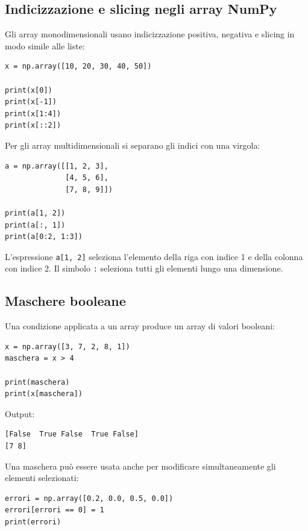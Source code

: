 \documentclass[11pt,a4paper]{book}
\begin{document}
\subsection{Indicizzazione e slicing negli array NumPy}

Gli array monodimensionali usano indicizzazione positiva, negativa e slicing in modo simile alle liste:

\begin{lstlisting}[style=python]
x = np.array([10, 20, 30, 40, 50])

print(x[0])
print(x[-1])
print(x[1:4])
print(x[::2])
\end{lstlisting}

Per gli array multidimensionali si separano gli indici con una virgola:

\begin{lstlisting}[style=python]
a = np.array([[1, 2, 3],
              [4, 5, 6],
              [7, 8, 9]])

print(a[1, 2])
print(a[:, 1])
print(a[0:2, 1:3])
\end{lstlisting}

L'espressione \texttt{a[1, 2]} seleziona l'elemento della riga con indice 1 e della colonna con indice 2. Il simbolo \texttt{:} seleziona tutti gli elementi lungo una dimensione.

\subsection{Maschere booleane}

Una condizione applicata a un array produce un array di valori booleani:

\begin{lstlisting}[style=python]
x = np.array([3, 7, 2, 8, 1])
maschera = x > 4

print(maschera)
print(x[maschera])
\end{lstlisting}

Output:

\begin{lstlisting}[style=python, numbers=none]
[False  True False  True False]
[7 8]
\end{lstlisting}

Una maschera può essere usata anche per modificare simultaneamente gli elementi selezionati:

\begin{lstlisting}[style=python]
errori = np.array([0.2, 0.0, 0.5, 0.0])
errori[errori == 0] = 1
print(errori)
\end{lstlisting}
\end{document}
